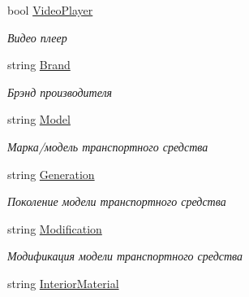 \begin{DoxyCompactItemize}
bool \hyperlink{class_r_t_1_1_parsing_libs_1_1_models_1_1_automoto_additional_info_a6df342550b107ccdcddbf6e6011d9c35}{Video\+Player}
\begin{DoxyCompactList}\small\item\em Видео плеер \end{DoxyCompactList}\item 
string \hyperlink{class_r_t_1_1_parsing_libs_1_1_models_1_1_automoto_additional_info_ae7f8603916fad1afa37cae1f7a3349a4}{Brand}
\begin{DoxyCompactList}\small\item\em Брэнд производителя \end{DoxyCompactList}\item 
string \hyperlink{class_r_t_1_1_parsing_libs_1_1_models_1_1_automoto_additional_info_a6bdef689a69884440fe1a1f49398471c}{Model}
\begin{DoxyCompactList}\small\item\em Марка/модель транспортного средства \end{DoxyCompactList}\item 
string \hyperlink{class_r_t_1_1_parsing_libs_1_1_models_1_1_automoto_additional_info_aa20be22806b9322320b66786a135c6c2}{Generation}
\begin{DoxyCompactList}\small\item\em Поколение модели транспортного средства \end{DoxyCompactList}\item 
string \hyperlink{class_r_t_1_1_parsing_libs_1_1_models_1_1_automoto_additional_info_a69e3193d4d7e339c99af2e2825eece15}{Modification}
\begin{DoxyCompactList}\small\item\em Модификация модели транспортного средства \end{DoxyCompactList}\item 
string \hyperlink{class_r_t_1_1_parsing_libs_1_1_models_1_1_automoto_additional_info_a4ebd833d6a053245158d45d35dbe1dea}{Interior\+Material}

\end{DoxyCompactItemize}
